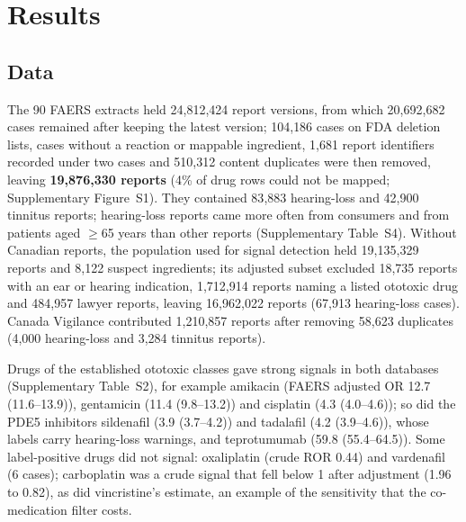 \documentclass[11pt]{article}
\begin{document}
\section{Results}

\subsection{Data}
The 90 FAERS extracts held 24{,}812{,}424 report versions, from which 20{,}692{,}682
cases remained after keeping the latest version; 104{,}186 cases on FDA deletion lists, cases without a
reaction or mappable ingredient, 1{,}681 report identifiers recorded under two cases and
510{,}312 content duplicates were then removed, leaving \textbf{19{,}876{,}330
reports} (4\% of drug rows could not be mapped; Supplementary Figure~S1). They contained
83{,}883 hearing-loss and 42{,}900 tinnitus reports; hearing-loss reports
came more often from consumers and from patients aged $\geq$65 years than other reports (Supplementary Table~S4). Without
Canadian reports, the population used for signal detection held 19{,}135{,}329 reports and 8{,}122 suspect
ingredients; its adjusted subset excluded 18{,}735 reports with an ear or hearing indication,
1{,}712{,}914 reports naming a listed ototoxic drug and 484{,}957 lawyer reports,
leaving 16{,}962{,}022 reports (67{,}913 hearing-loss cases). Canada Vigilance
contributed 1{,}210{,}857 reports after removing 58{,}623 duplicates
(4{,}000 hearing-loss and 3{,}284 tinnitus reports).

Drugs of the established ototoxic classes gave strong signals in both databases (Supplementary Table~S2), for example
amikacin (FAERS adjusted OR 12.7 (11.6--13.9)), gentamicin (11.4 (9.8--13.2)) and cisplatin (4.3 (4.0--4.6)); so did
the PDE5 inhibitors sildenafil (3.9 (3.7--4.2)) and tadalafil (4.2 (3.9--4.6)), whose labels carry hearing-loss
warnings, and teprotumumab (59.8 (55.4--64.5)). Some label-positive drugs did not signal: oxaliplatin (crude ROR
0.44) and vardenafil (6 cases); carboplatin was a
crude signal that fell below 1 after adjustment (1.96 to
0.82), as did vincristine's estimate, an example of the sensitivity that the
co-medication filter costs.
\end{document}
